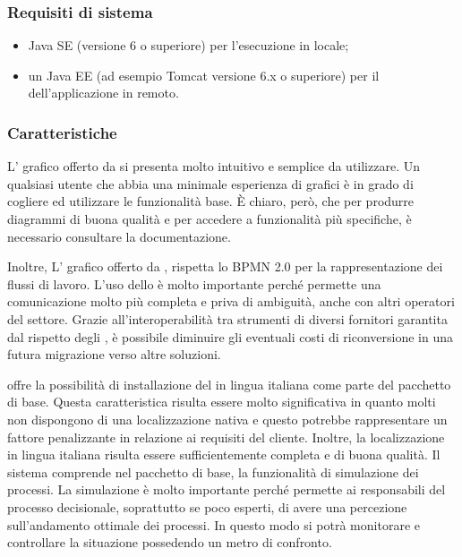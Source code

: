 \subsubsection{Requisiti di sistema}
\begin{itemize}
\item Java SE  (versione 6 o superiore) per l'esecuzione in locale;
\item un  Java EE (ad esempio Tomcat versione 6.x o superiore) per il  dell'applicazione in remoto.
\end{itemize}


\subsubsection{Caratteristiche}

L' grafico offerto da \progname si presenta molto intuitivo e semplice da utilizzare. Un qualsiasi utente che abbia una minimale esperienza di  grafici è in grado di cogliere ed utilizzare le funzionalità base. È  chiaro, però, che per produrre diagrammi di buona qualità e per accedere a funzionalità più specifiche, è necessario consultare la documentazione. 

Inoltre, L' grafico offerto da \progname, rispetta lo  BPMN 2.0 per la rappresentazione dei flussi di lavoro. L'uso dello  è molto importante perché permette una comunicazione molto più completa e priva di ambiguità, anche con altri operatori del settore. Grazie all'interoperabilità tra strumenti di diversi fornitori garantita dal rispetto degli , è possibile diminuire gli eventuali costi di riconversione in una futura migrazione verso altre soluzioni.

\progname offre la possibilità di installazione del \sw in lingua italiana come parte del pacchetto di base. Questa caratteristica risulta essere molto significativa in quanto molti \sw non dispongono di una localizzazione nativa e questo potrebbe rappresentare un fattore penalizzante in relazione ai requisiti del cliente. Inoltre, la localizzazione in lingua italiana risulta essere sufficientemente completa e di buona qualità. 
 Il sistema \progname comprende nel pacchetto di base, la funzionalità di simulazione dei processi. La simulazione è molto importante perché permette ai responsabili del processo decisionale, soprattutto se poco esperti, di avere una percezione sull'andamento ottimale dei processi. In questo modo si potrà monitorare e controllare la situazione possedendo un metro di confronto.

